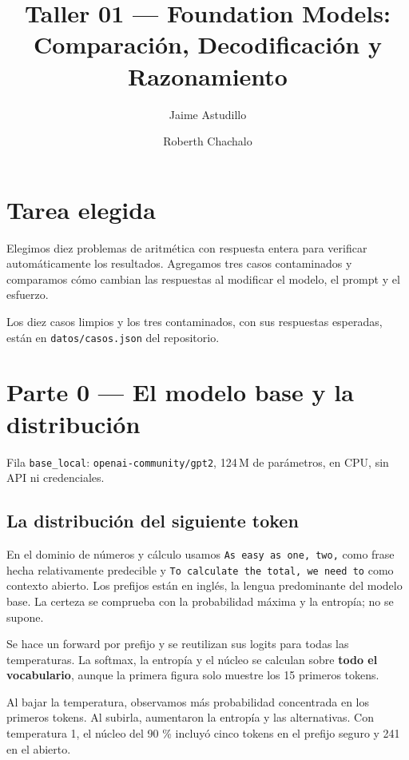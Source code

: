 \documentclass[runningheads]{llncs}
\begin{document}
\title{Taller 01 --- Foundation Models: Comparación, Decodificación y Razonamiento}
\author{Jaime Astudillo \and Roberth Chachalo}
\maketitle

\section{Tarea elegida}
Elegimos diez problemas de aritmética con respuesta entera para verificar
automáticamente los resultados. Agregamos tres casos contaminados y comparamos cómo
cambian las respuestas al modificar el modelo, el prompt y el esfuerzo.

Los diez casos limpios y los tres contaminados, con sus respuestas esperadas, están en \texttt{datos/casos.json} del repositorio.

\section{Parte 0 --- El modelo base y la distribución}
Fila \texttt{base\_local}: \texttt{openai-community/gpt2}, 124\,M de parámetros, en CPU, sin API ni credenciales.

\subsection{La distribución del siguiente token}
En el dominio de números y cálculo usamos \texttt{As easy as one, two,} como frase
hecha relativamente predecible y \texttt{To calculate the total, we need to} como
contexto abierto. Los prefijos están en inglés, la lengua predominante del
modelo base.
La certeza se comprueba con la probabilidad máxima y la entropía; no se supone.

Se hace un forward por prefijo y se reutilizan sus logits para todas las
temperaturas. La softmax, la entropía y el núcleo se calculan sobre \textbf{todo el
vocabulario}, aunque la primera figura solo muestre los 15 primeros tokens.

Al bajar la temperatura, observamos más probabilidad concentrada en los primeros
tokens. Al subirla, aumentaron la entropía y las alternativas. Con temperatura
1, el núcleo del 90 \% incluyó cinco tokens en el prefijo seguro y 241 en el
abierto.
\end{document}
